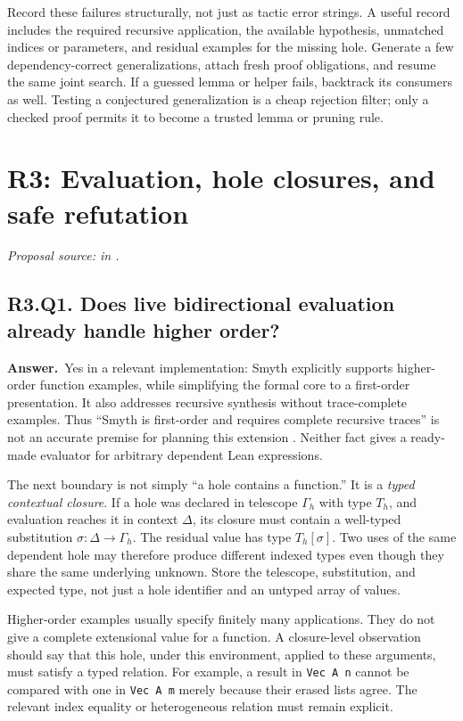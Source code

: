 \documentclass[11pt,a4paper]{article}
\theoremstyle{definition}
\theoremstyle{remark}
\newcommand{\code}[1]{\texttt{#1}}
\newcommand{\answer}{\par\noindent\textbf{Answer.}\ }
\newcommand{\sourcepart}[1]{\par\noindent\textit{Proposal source: #1 in \cite{proposal}.}}
\newcommand{\qheading}[2]{\subsection{#1. #2}}
\begin{document}
Record these failures structurally, not just as tactic error strings. A useful
record includes the required recursive application, the available hypothesis,
unmatched indices or parameters, and residual examples for the missing hole.
Generate a few dependency-correct generalizations, attach fresh proof obligations,
and resume the same joint search. If a guessed lemma or helper fails, backtrack
its consumers as well. Testing a conjectured generalization is a cheap rejection
filter; only a checked proof permits it to become a trusted lemma or pruning rule.

\section{R3: Evaluation, hole closures, and safe refutation}
\label{sec:r3}
\sourcepart{}

\qheading{R3.Q1}{Does live bidirectional evaluation already handle higher order?}
\answer Yes in a relevant implementation: Smyth explicitly supports
higher-order function examples, while simplifying the formal core to a
first-order presentation. It also addresses recursive synthesis without
trace-complete examples. Thus ``Smyth is first-order and requires complete
recursive traces'' is not an accurate premise for planning this extension
\cite{smyth}. Neither fact gives a ready-made evaluator for arbitrary dependent
Lean expressions.

The next boundary is not simply ``a hole contains a function.'' It is a
\emph{typed contextual closure}. If a hole was declared in telescope $\Gamma_h$
with type $T_h$, and evaluation reaches it in context $\Delta$, its closure
must contain a well-typed substitution $\sigma:\Delta\to\Gamma_h$. The residual
value has type $T_h[\sigma]$. Two uses of the same dependent hole may therefore
produce different indexed types even though they share the same underlying
unknown. Store the telescope, substitution, and expected type, not just a hole
identifier and an untyped array of values.

Higher-order examples usually specify finitely many applications. They do not
give a complete extensional value for a function. A closure-level observation
should say that this hole, under this environment, applied to these arguments,
must satisfy a typed relation. For example, a result in \code{Vec A n} cannot
be compared with one in \code{Vec A m} merely because their erased lists agree.
The relevant index equality or heterogeneous relation must remain explicit.
\end{document}
